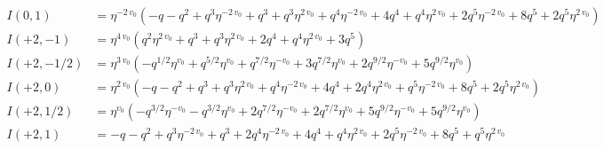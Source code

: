 \documentclass{article}
\begin{document}
\begin{align*}
I(0, 1) &= \eta^{-2 \, v_{0}} \left( -q - q^{2} + q^{3} \eta^{-2 \, v_{0}} + q^{3} + q^{3} \eta^{2 \, v_{0}} + q^{4} \eta^{-2 \, v_{0}} + 4 q^{4} + q^{4} \eta^{2 \, v_{0}} + 2 q^{5} \eta^{-2 \, v_{0}} + 8 q^{5} + 2 q^{5} \eta^{2 \, v_{0}} \right) \\
I(+2, -1) &= \eta^{4 \, v_{0}} \left( q^{2} \eta^{2 \, v_{0}} + q^{3} + q^{3} \eta^{2 \, v_{0}} + 2 q^{4} + q^{4} \eta^{2 \, v_{0}} + 3 q^{5} \right) \\
I(+2, -1/2) &= \eta^{3 \, v_{0}} \left( -q^{1/2} \eta^{v_{0}} + q^{5/2} \eta^{v_{0}} + q^{7/2} \eta^{-v_{0}} + 3 q^{7/2} \eta^{v_{0}} + 2 q^{9/2} \eta^{-v_{0}} + 5 q^{9/2} \eta^{v_{0}} \right) \\
I(+2, 0) &= \eta^{2 \, v_{0}} \left( -q - q^{2} + q^{3} + q^{3} \eta^{2 \, v_{0}} + q^{4} \eta^{-2 \, v_{0}} + 4 q^{4} + 2 q^{4} \eta^{2 \, v_{0}} + q^{5} \eta^{-2 \, v_{0}} + 8 q^{5} + 2 q^{5} \eta^{2 \, v_{0}} \right) \\
I(+2, 1/2) &= \eta^{v_{0}} \left( -q^{3/2} \eta^{-v_{0}} - q^{3/2} \eta^{v_{0}} + 2 q^{7/2} \eta^{-v_{0}} + 2 q^{7/2} \eta^{v_{0}} + 5 q^{9/2} \eta^{-v_{0}} + 5 q^{9/2} \eta^{v_{0}} \right) \\
I(+2, 1) &= -q - q^{2} + q^{3} \eta^{-2 \, v_{0}} + q^{3} + 2 q^{4} \eta^{-2 \, v_{0}} + 4 q^{4} + q^{4} \eta^{2 \, v_{0}} + 2 q^{5} \eta^{-2 \, v_{0}} + 8 q^{5} + q^{5} \eta^{2 \, v_{0}} \\
\end{align*}
\end{document}
